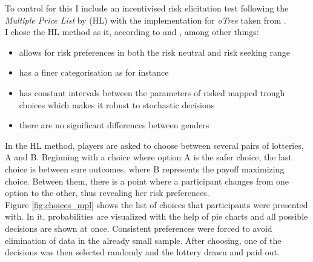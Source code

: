     To control for this I include an incentivised risk elicitation test following the \textit{Multiple Price List} by \cite{holt2002} (HL) with the implementation for \textit{oTree} taken from \cite{holzmeister2017}.\\
    
    I chose the HL method as it, according to \cite{crosetto2016} and \cite{harrison2008}, among other things:
    \begin{itemize}
        \item allows for risk preferences in both the risk neutral and risk seeking range
        \item has a finer categorisation as for instance \cite{eckel2008}
        \item has constant intervals between the parameters of risked mapped trough choices which makes it robust to stochastic decisions
        \item there are no significant differences between genders
    \end{itemize}  
       
     In the HL method, players are asked to choose between several pairs of lotteries, A and B. Beginning with a choice where option A is the safer choice, the last choice is between sure outcomes, where B represents the payoff maximizing choice. Between them, there is a point where a participant changes from one option to the other, thus revealing her risk preferences.\\
     Figure \ref{fig:choices_mpl} shows the list of choices that participants were presented with. In it, probabilities are visualized with the help of pie charts and all possible decisions are shown at once. Consistent preferences were forced to avoid elimination of data in the already small sample. After choosing, one of the decisions was then selected randomly and the lottery drawn and paid out.\\
     
